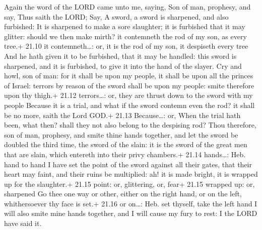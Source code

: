  Again the word of the LORD came unto me, saying,
 Son of man, prophesy, and say, Thus saith the LORD; Say, A
sword, a sword is sharpened, and also furbished:  It is
sharpened to make a sore slaughter; it is furbished that it may glitter:
should we then make mirth? it contemneth the rod of my son, as every
tree.+ 21.10 it contemneth\ldots: or, it is the rod of my son, it
despiseth every tree  And he hath given it to be furbished,
that it may be handled: this sword is sharpened, and it is furbished, to
give it into the hand of the slayer.  Cry and howl, son of
man: for it shall be upon my people, it shall be upon all the princes of
Israel: terrors by reason of the sword shall be upon my people: smite
therefore upon thy thigh.+ 21.12 terrors\ldots: or, they are thrust down
to the sword with my people  Because it is a trial, and
what if the sword contemn even the rod? it shall be no more, saith the
Lord GOD.+ 21.13 Because\ldots: or, When the trial hath been, what then?
shall they not also belong to the despising rod?  Thou
therefore, son of man, prophesy, and smite thine hands together, and let
the sword be doubled the third time, the sword of the slain: it is the
sword of the great men that are slain, which entereth into their privy
chambers.+ 21.14 hands\ldots: Heb. hand to hand  I have set
the point of the sword against all their gates, that their heart may
faint, and their ruins be multiplied: ah! it is made bright, it is
wrapped up for the slaughter.+ 21.15 point: or, glittering, or, fear+
21.15 wrapped up: or, sharpened  Go thee one way or other,
either on the right hand, or on the left, whithersoever thy face is
set.+ 21.16 or on\ldots: Heb. set thyself, take the left hand
 I will also smite mine hands together, and I will cause my
fury to rest: I the LORD have said it.

